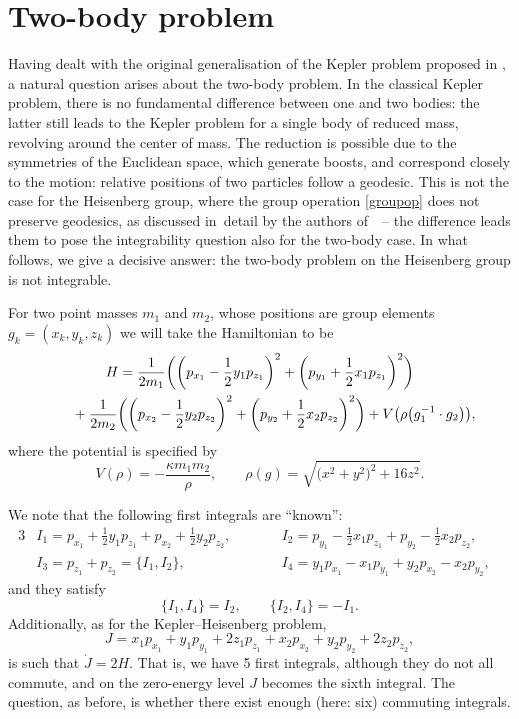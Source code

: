 \documentclass[pdftex]{sigma}
\numberwithin{equation}{section}
\begin{document}
\section{Two-body problem}

Having dealt with the original generalisation of the Kepler problem
proposed in \cite{1}, a natural question arises about the two-body
problem. In the classical Kepler problem, there is no fundamental
difference between one and two bodies: the latter still leads to the
Kepler problem for a single body of reduced mass, revolving around the
center of mass. The reduction is possible due to the symmetries of the Euclidean space, which generate boosts, and correspond closely to the motion: relative positions of two particles follow a geodesic. This is not the case for the Heisenberg group, where the group operation \eqref{groupop} does not preserve geodesics, as discussed in~detail by the authors of~\cite{1}~-- the difference leads them to pose the integrability question also for the two-body case. In what follows, we give a decisive answer: the two-body problem on the Heisenberg group is not integrable.

For two point masses $m_1$ and $m_2$, whose positions are group
elements $g_k = (x_k,y_k,z_k)$ we will take the Hamiltonian to be
\begin{gather}
 H = \frac{1}{2m_1}\bigg(\bigg(p_{x_1}-\frac12 y_1 p_{z_1}\bigg)^2
 + \bigg(p_{y_1}+\frac12 x_1 p_{z_1}\bigg)^2\bigg)\nonumber
 \\ \hphantom{H =}
 {}+ \frac{1}{2m_2}\bigg(\bigg(p_{x_2}-\frac12 y_2 p_{z_2}\bigg)^2 +
 \bigg(p_{y_2}+\frac12 x_2 p_{z_2}\bigg)^2\bigg) +
 V\big(\rho\big(g_1^{-1}\cdot g_2\big)\big),\label{eq:2b}
\end{gather}
where the potential is specified by
\begin{equation*}
 V(\rho) = -\frac{\kappa m_1 m_2}{\rho},\qquad
 \rho(g) = \sqrt{\big(x^2+y^2\big)^2+{16}z^2}.
\end{equation*}

We note that the following first integrals are ``known'':
\begin{alignat*}{3}
& I_1 = p_{x_1} +\frac12 y_1 p_{z_1} + p_{x_2} +\frac12 y_2 p_{z_2},
 \qquad&&
 I_2 = p_{y_1} -\frac12 x_1 p_{z_1} + p_{y_2} -\frac12 x_2 p_{z_2},&
 \\
 &I_3 = p_{z_1}+p_{z_2}=\{I_1,I_2\},
 \qquad&&
 I_4 = y_1 p_{x_1}-x_1 p_{y_1} + y_2 p_{x_2} - x_2 p_{y_2},&
\end{alignat*}
and they satisfy
\begin{equation*}
 \{I_1,I_4\}=I_2, \qquad
 \{I_2,I_4\} = -I_1.
\end{equation*}
Additionally, as for the Kepler--Heisenberg problem,
\begin{equation*}
 J = x_1 p_{x_1} + y_1 p_{y_1} + 2 z_1 p_{z_1} + x_2 p_{x_2} + y_2 p_{y_2} + 2 z_2 p_{z_2},
\end{equation*}
is such that $\dot{J}=2H$. That is, we have 5 first integrals,
although they do not all commute, and on the zero-energy level $J$
becomes the sixth integral. The question, as before, is whether there
exist enough (here: six) commuting integrals.
\end{document}
